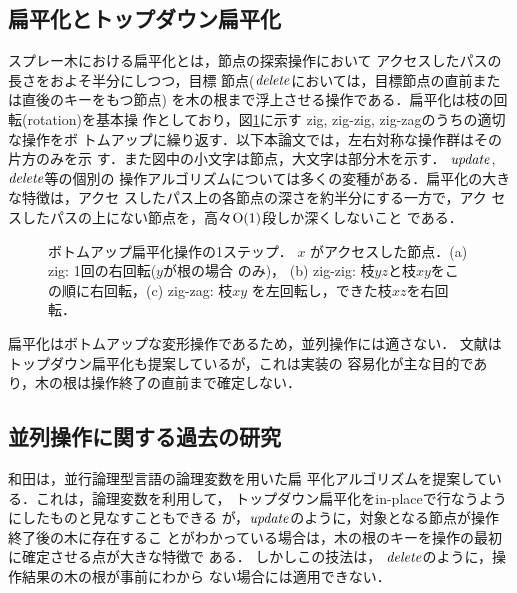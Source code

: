 \documentclass{compsoft}
\begin{document}
\subsection{扁平化とトップダウン扁平化}\label{subsection:splaying}

スプレー木における扁平化とは，節点の探索操作において
アクセスしたパスの長さをおよそ半分にしつつ，目標
節点(${\it delete\/}$においては，目標節点の直前または直後のキーをもつ節点)
を木の根まで浮上させる操作である．扁平化は枝の回転(rotation)を基本操
作としており，図\ref{figure:splaying}に示す
zig, zig-zig, zig-zagのうちの適切な操作をボ
トムアップに繰り返す．以下本論文では，左右対称な操作群はその片方のみを示
す．また図中の小文字は節点，大文字は部分木を示す．
%
${\it update}$, ${\it delete\/}$等の個別の
操作アルゴリズムについては多くの変種がある．扁平化の大きな特徴は，アクセ
スしたパス上の各節点の深さを約半分にする一方で，アク
セスしたパスの上にない節点を，高々${\rm O}(1)$段しか深くしないこと
である．

\begin{figure}[tb]
\begin{center}
\end{center}
\caption{
ボトムアップ扁平化操作の1ステップ． %
$x$ がアクセスした節点．(a) zig: 1回の右回転($y$が根の場合
のみ)，
(b) zig-zig: 枝$yz$と枝$xy$をこの順に右回転，(c) zig-zag: 枝$xy$
を左回転し，できた枝$xz$を右回転．}
\label{figure:splaying}
\end{figure}

扁平化はボトムアップな変形操作であるため，並列操作には適さない．
文献\Cite{ST85}はトップダウン扁平化も提案しているが，これは実装の
容易化が主な目的であり，木の根は操作終了の直前まで確定しない．


\subsection{並列操作に関する過去の研究}\label{subsection:related-parallel}

和田\cite{W90}は，並行論理型言語\cite{S89}の論理変数を用いた扁
平化アルゴリズムを提案している．これは，論理変数を利用して，
トップダウン扁平化をin-placeで行なうようにしたものと見なすこともできる
が，${\it update\/}$のように，対象となる節点が操作終了後の木に存在するこ
とがわかっている場合は，木の根のキーを操作の最初に確定させる点が大きな特徴で
ある．
% 
%
しかしこの技法は，
${\it delete\/}$のように，操作結果の木の根が事前にわから
ない場合には適用できない．
\end{document}
